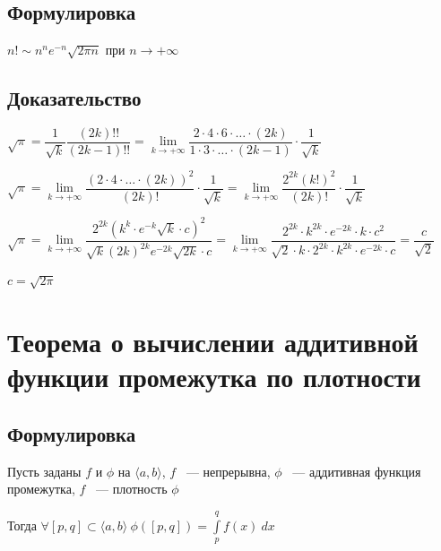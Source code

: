 \documentclass{article}
\begin{document}
        \subsection{Формулировка}
        
            $n! \sim n^n e^{-n} \sqrt{2 \pi n}$ при $n \rightarrow +\infty$
            
        \subsection{Доказательство}
        
            $\sqrt{\pi} = \dfrac{1}{\sqrt{k}} \dfrac{(2k)!!}{(2k - 1)!!} = \lim\limits_{k \rightarrow +\infty} \dfrac{2 \cdot 4 \cdot 6 \cdot \ldots \cdot (2k)}{1 \cdot 3 \cdot \ldots \cdot (2k - 1)} \cdot \dfrac{1}{\sqrt{k}}$
            
            $\sqrt{\pi} = \lim\limits_{k \rightarrow +\infty} \dfrac{(2 \cdot 4 \cdot \ldots \cdot (2k))^2}{(2k)!} \cdot \dfrac{1}{\sqrt{k}} = \lim\limits_{k \rightarrow +\infty} \dfrac{2^{2k} (k!)^2}{(2k)!} \cdot \dfrac{1}{\sqrt{k}}$
            
            $\sqrt{\pi} = \lim\limits_{k \rightarrow +\infty} \dfrac{2^{2k} (k^k \cdot e^{-k} \sqrt{k} \cdot c)^2}{\sqrt{k} (2k)^{2k} e^{-2k} \sqrt{2k} \cdot c} = \lim\limits_{k \rightarrow +\infty} \dfrac{2^{2k} \cdot k^{2k} \cdot e^{-2k} \cdot k \cdot c^2}{\sqrt{2} \cdot k \cdot 2^{2k} \cdot k^{2k} \cdot e^{-2k} \cdot c} = \dfrac{c}{\sqrt{2}}$
            
            $c = \sqrt{2 \pi}$
            
    \newpage
    
    \section{Теорема о вычислении аддитивной функции промежутка по плотности}
    
        \subsection{Формулировка}
        
            Пусть заданы $f$ и $\phi$ на $\langle a, b \rangle$, $f$ ~--- непрерывна, $\phi$ ~--- аддитивная функция промежутка, $f$ ~--- плотность $\phi$
            
            Тогда $\forall [p, q] \subset \langle a, b \rangle \ \phi([p, q]) = \int\limits^q_p f(x) \ dx$
            
\end{document}
